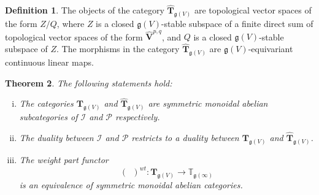 \documentclass[12pt,reqno]{amsart}
\newtheorem{thm}{Theorem}[section]
\theoremstyle{definition}
\newtheorem{defn}[thm]{Definition}
\theoremstyle{remark}
\begin{document}
	
	
	
        

        \begin{defn}
		The objects of the category $\widehat{{\mathbf T}}_{\mathfrak{g}(V)}$ are topological vector spaces of the form $Z/Q$, where $Z$ is a closed $\mathfrak{g}(V)$-stable subspace of a finite direct sum of topological vector spaces of the form $\widehat{\mathbf{V}}^{p,q}$, and $Q$ is a closed $\mathfrak{g}(V)$-stable subspace of $Z$. The morphisms in the category $\widehat{\mathbf{T}}_{\mathfrak{g}(V)}$ are $\mathfrak{g}(V)$-equivariant continuous linear maps.
	\end{defn}

        \begin{thm}\label{thm:main}
	The following statements hold:
	\begin{enumerate}[(i)]
	    \item \label{uno}
	    The categories $\mathbf{T}_{\mathfrak{g}(V)}$ and $\widehat{{\mathbf T}}_{\mathfrak{g}(V)}$ are symmetric monoidal abelian subcategories of $\mathcal{I}$ and $\mathcal{P}$ respectively.
	    \item \label{due}
	    The duality between $\mathcal{I}$ and $\mathcal{P}$ restricts to a duality between $\mathbf{T}_{\mathfrak{g}(V)}$ and $\widehat{{\mathbf T}}_{\mathfrak{g}(V)}$.
	    \item \label{tre}
	    The weight part functor
	    $$
	    (\phantom{a})^{wt}: \mathbf{T}_{\mathfrak{g}(V)} \rightarrow \mathbb{T}_{\mathfrak{g}(\infty)}
	    $$
	    is an equivalence of symmetric monoidal abelian categories.
	\end{enumerate}
	\end{thm}
\end{document}
